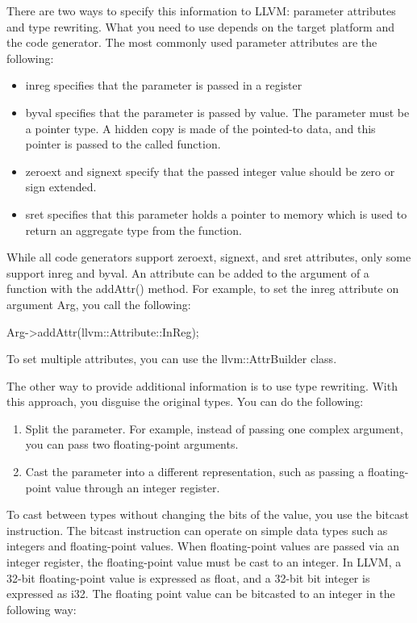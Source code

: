 There are two ways to specify this information to LLVM: parameter attributes and type rewriting.
What you need to use depends on the target platform and the code generator. The most commonly used parameter attributes are the following:

\begin{itemize}
\item
inreg specifies that the parameter is passed in a register

\item
byval specifies that the parameter is passed by value. The parameter must be a pointer type.
A hidden copy is made of the pointed-to data, and this pointer is passed to the called function.

\item
zeroext and signext specify that the passed integer value should be zero or sign extended.

\item
sret specifies that this parameter holds a pointer to memory which is used to return an aggregate type from the function.
\end{itemize}

While all code generators support zeroext, signext, and sret attributes, only some support inreg and byval. An attribute can be added to the argument of a function with the addAttr() method. For example, to set the inreg attribute on argument Arg, you call the following:

\begin{cpp}
Arg->addAttr(llvm::Attribute::InReg);
\end{cpp}

To set multiple attributes, you can use the llvm::AttrBuilder class.

The other way to provide additional information is to use type rewriting. With this approach, you disguise the original types. You can do the following:

\begin{enumerate}
\item
Split the parameter. For example, instead of passing one complex argument, you can pass two floating-point arguments.

\item
Cast the parameter into a different representation, such as passing a floating-point value through an integer register.
\end{enumerate}

To cast between types without changing the bits of the value, you use the bitcast instruction. The bitcast instruction can operate on simple data types such as integers and floating-point values. When floating-point values are passed via an integer register, the floating-point value must be cast to an integer. In LLVM, a 32-bit floating-point value is expressed as float, and a 32-bit bit integer is expressed as i32. The floating point value can be bitcasted to an integer in the following way:

